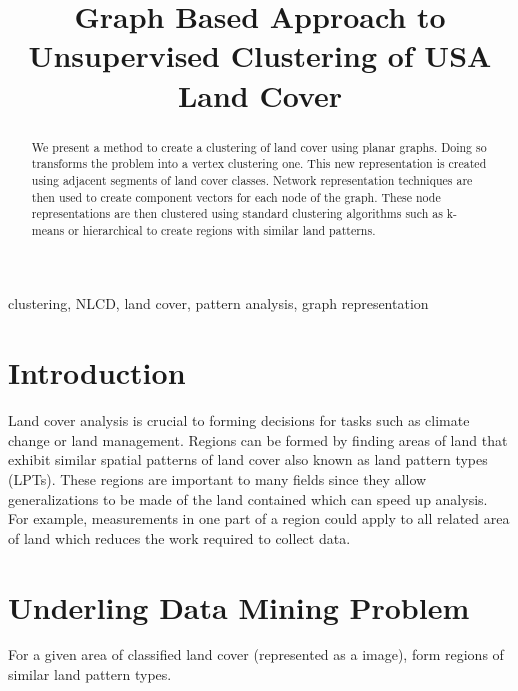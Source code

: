 \documentclass[journal,compsoc]{IEEEtran}
\begin{document}
	
\title{Graph Based Approach to Unsupervised Clustering of USA Land Cover}

\author{
}

\maketitle

\begin{abstract}
	We present a method to create a clustering of land cover using planar graphs. Doing so transforms the problem into a vertex clustering one. This new representation is created using adjacent segments of land cover classes. Network representation techniques are then used to create component vectors for each node of the graph. These node representations are then clustered using standard clustering algorithms such as k-means or hierarchical to create regions with similar land patterns.
\end{abstract}

\begin{IEEEkeywords}
	clustering, NLCD, land cover, pattern analysis, graph representation
\end{IEEEkeywords}

\section{Introduction}
Land cover analysis is crucial to forming decisions for tasks such as climate change or land management\cite{doi:10.1080/13658816.2015.1134796}. Regions can be formed by finding areas of land that exhibit similar spatial patterns of land cover also known as land pattern types (LPTs). These regions are important to many fields since they allow generalizations to be made of the land contained which can speed up analysis\cite{doi:10.1080/13658816.2015.1134796}. For example, measurements in one part of a region could apply to all related area of land which reduces the work required to collect data.

\section{Underling Data Mining Problem}
For a given area of classified land cover (represented as a image), form regions of similar land pattern types.
\end{document}

